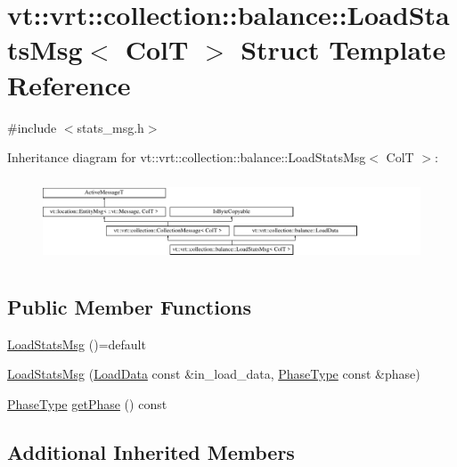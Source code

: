\hypertarget{structvt_1_1vrt_1_1collection_1_1balance_1_1_load_stats_msg}{}\section{vt\+:\+:vrt\+:\+:collection\+:\+:balance\+:\+:Load\+Stats\+Msg$<$ ColT $>$ Struct Template Reference}
\label{structvt_1_1vrt_1_1collection_1_1balance_1_1_load_stats_msg}


{\ttfamily \#include $<$stats\+\_\+msg.\+h$>$}

Inheritance diagram for vt\+:\+:vrt\+:\+:collection\+:\+:balance\+:\+:Load\+Stats\+Msg$<$ ColT $>$\+:\begin{figure}[H]
\begin{center}
\leavevmode
\includegraphics[height=2.514029cm]{structvt_1_1vrt_1_1collection_1_1balance_1_1_load_stats_msg}
\end{center}
\end{figure}
\subsection*{Public Member Functions}
\begin{DoxyCompactItemize}
\item 
\hyperlink{structvt_1_1vrt_1_1collection_1_1balance_1_1_load_stats_msg_acb37915875685edfc80d6282cd493a58}{Load\+Stats\+Msg} ()=default
\item 
\hyperlink{structvt_1_1vrt_1_1collection_1_1balance_1_1_load_stats_msg_a070605d1d3f9a70f7a8681d0f5fc827b}{Load\+Stats\+Msg} (\hyperlink{structvt_1_1vrt_1_1collection_1_1balance_1_1_load_data}{Load\+Data} const \&in\+\_\+load\+\_\+data, \hyperlink{namespacevt_a46ce6733d5cdbd735d561b7b4029f6d7}{Phase\+Type} const \&phase)
\item 
\hyperlink{namespacevt_a46ce6733d5cdbd735d561b7b4029f6d7}{Phase\+Type} \hyperlink{structvt_1_1vrt_1_1collection_1_1balance_1_1_load_stats_msg_acfce435d77d32952996e334701fe28ed}{get\+Phase} () const
\end{DoxyCompactItemize}
\subsection*{Additional Inherited Members}


